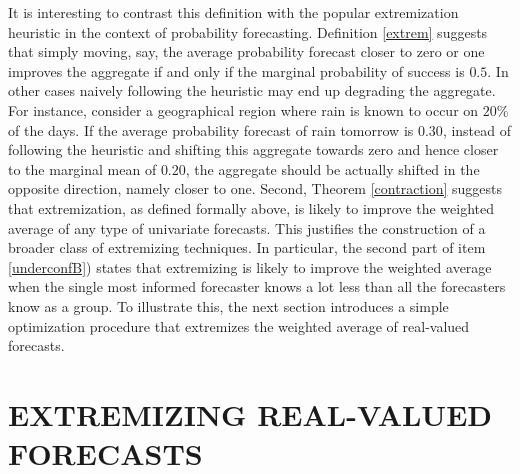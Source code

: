 \documentclass[12pt]{article}
\theoremstyle{definition}
\theoremstyle{definition}
\begin{document}
\noindent
It is interesting to contrast this definition with the popular extremization heuristic in the context of probability forecasting.  Definition \ref{extrem} suggests that simply moving, say, the average probability forecast closer to zero or one improves the aggregate if and only if the marginal probability of success is $0.5$. In other cases naively following the heuristic may end up degrading the aggregate. For instance, consider a geographical region where rain is known to occur on $20$\% of the days. If the average probability forecast of rain tomorrow is $0.30$, instead of following the heuristic and shifting this aggregate towards zero and hence closer to the marginal mean of $0.20$, the aggregate should be actually shifted in the opposite direction, namely closer to one. Second, Theorem \ref{contraction} suggests that extremization, as defined formally above, is likely to improve the weighted average of any type of univariate forecasts. This justifies the construction of a broader class of extremizing techniques. In particular, the second part of item \ref{underconfB}) states that extremizing is likely to improve the weighted average when 
 the single most informed forecaster knows a lot less than all the forecasters know as a group. To illustrate this, the next section introduces a simple optimization procedure that extremizes the weighted average of real-valued forecasts.
%
%




\section{EXTREMIZING REAL-VALUED FORECASTS} \label{extremization}

\end{document}
